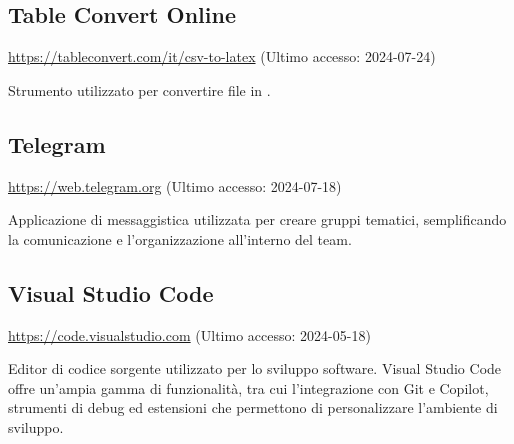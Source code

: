 \subsection{Table Convert Online}
\par \href{https://tableconvert.com/it/csv-to-latex}{https://tableconvert.com/it/csv-to-latex} (Ultimo accesso: 2024-07-24)
\par Strumento utilizzato per convertire file  in .

\subsection{Telegram}
\par \href{https://web.telegram.org}{https://web.telegram.org} (Ultimo accesso: 2024-07-18)
\par Applicazione di messaggistica utilizzata per creare gruppi tematici, semplificando la comunicazione e l'organizzazione all'interno del team.
    
\subsection{Visual Studio Code}
\par \href{https://code.visualstudio.com}{https://code.visualstudio.com} (Ultimo accesso: 2024-05-18)
\par Editor di codice sorgente utilizzato per lo sviluppo software. Visual Studio Code offre un’ampia gamma di funzionalità, tra cui l'integrazione con Git e Copilot, strumenti di debug ed estensioni che permettono di personalizzare l’ambiente di sviluppo.

